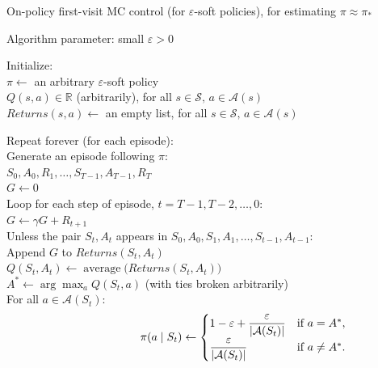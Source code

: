 \begin{algobox}{On-policy first-visit MC control (for $\varepsilon$-soft policies), for estimating $\pi \approx \pi_*$}
\raggedright
Algorithm parameter: small $\varepsilon > 0$

\medskip
Initialize:\\
\hspace*{1.5em}$\pi \leftarrow$ an arbitrary $\varepsilon$-soft policy\\
\hspace*{1.5em}$Q(s,a) \in \mathbb{R}$ (arbitrarily), for all $s \in \mathcal{S},\, a \in \mathcal{A}(s)$\\
\hspace*{1.5em}$\mathit{Returns}(s,a) \leftarrow$ an empty list, for all $s \in \mathcal{S},\, a \in \mathcal{A}(s)$

\medskip
Repeat forever (for each episode):\\
\hspace*{1.5em}Generate an episode following $\pi$:\\
\hspace*{3em}$S_0, A_0, R_1, \dots, S_{T-1}, A_{T-1}, R_T$\\
\hspace*{1.5em}$G \leftarrow 0$\\
\hspace*{1.5em}Loop for each step of episode, $t = T-1, T-2, \dots, 0$:\\
\hspace*{3em}$G \leftarrow \gamma G + R_{t+1}$\\
\hspace*{3em}Unless the pair $S_t,A_t$ appears in $S_0,A_0,S_1,A_1,\dots,S_{t-1},A_{t-1}$:\\
\hspace*{4.5em}Append $G$ to $\mathit{Returns}(S_t,A_t)$\\
\hspace*{4.5em}$Q(S_t,A_t) \leftarrow \operatorname{average}\bigl(\mathit{Returns}(S_t,A_t)\bigr)$\\
\hspace*{4.5em}$A^* \leftarrow \arg\max_a Q(S_t,a)$ (with ties broken arbitrarily)\\
\hspace*{4.5em}For all $a \in \mathcal{A}(S_t)$:
\[
\hspace*{6em}
\pi(a \mid S_t) \leftarrow
\begin{cases}
1-\varepsilon+\dfrac{\varepsilon}{|\mathcal{A}(S_t)|}
& \text{if } a=A^*,\\[6pt]
\dfrac{\varepsilon}{|\mathcal{A}(S_t)|}
& \text{if } a\neq A^*.
\end{cases}
\]
\end{algobox}


